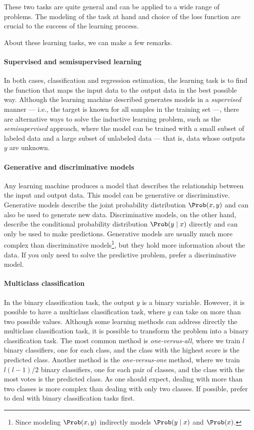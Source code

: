 These two tasks are quite general and can be applied to a wide range of problems.  The
modeling of the task at hand and choice of the loss function are crucial to the success of
the learning process.

About these learning tasks, we can make a few remarks.

\paragraph{Supervised and semisupervised learning}
In both cases, classification and regression estimation, the learning task is to find the function
that maps the input data to the output data in the best possible way.  Although the
learning machine described generates models in a \emph{supervised} manner --- i.e., the target
is known for all samples in the training set ---, there are
alternative ways to solve the inductive learning problem, such as the \emph{semisupervised}
approach, where the model can be trained with a small subset of labeled data and a large
subset of unlabeled data --- that is, data whose outputs $y$ are unknown.

\paragraph{Generative and discriminative models}
Any learning machine produces a model that describes the relationship between the input
and output data.  This model can be generative or discriminative.  Generative models
describe the joint probability distribution $\Prob(x, y)$ and can also be used to generate new
data.  Discriminative models, on the other hand, describe the conditional probability
distribution $\Prob(y \mid x)$ directly and can only be used to make predictions. Generative models are
usually much more complex than discriminative models\footnote{Since modeling $\Prob(x, y)$
indirectly models $\Prob(y \mid x)$ and $\Prob(x)$.}, but they hold more information about
the data.  If you only
need to solve the predictive problem, prefer a discriminative model.

\paragraph{Multiclass classification}
In the binary classification task, the output $y$ is
a binary variable.  However, it is possible to have a multiclass classification task,
where  $y$ can take on more than two possible values.  Although some learning methods can
address directly the multiclass classification task, it is possible to transform the
problem into a binary classification task.  The most common method is
\emph{one-versus-all}, where we train $l$ binary classifiers, one for each class,
and the class with the highest score is the predicted class.  Another method is the
\emph{one-versus-one} method, where we train $l(l-1)/2$ binary classifiers, one for each
pair of classes, and the class with the most votes is the predicted class.
As one should expect, dealing with more than two classes is more complex than dealing
with only two classes.  If possible, prefer to deal with binary classification tasks first.

